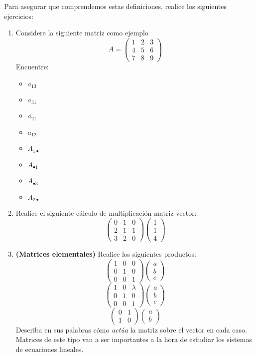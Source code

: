 Para asegurar que comprendemos estas definiciones, realice los siguientes ejercicios:

\begin{enumerate}
    \item Considere la siguiente matriz como ejemplo
    $$ A = \begin{pmatrix} 1 & 2 & 3 \\ 4 & 5 & 6 \\ 7 & 8 & 9  \end{pmatrix} $$
    Encuentre:
    \begin{itemize}
        \item $a_{13}$
        \item $a_{31}$
        \item $a_{21}$
        \item $a_{12}$
        \item $A_{1  \bullet}$
        \item $A_{\bullet  1}$
        \item $A_{\bullet  3}$
        \item $A_{2  \bullet}$
    \end{itemize}
    \item Realice el siguiente cálculo de multiplicación matriz-vector:
    $$  \begin{pmatrix} 0 & 1 & 0 \\ 2 & 1 & 1 \\ 3 & 2 & 0  \end{pmatrix} \begin{pmatrix} 1 \\ 1 \\ 4  \end{pmatrix} $$
    \item \textbf{(Matrices elementales)} Realice los siguientes productos:
$$  \begin{pmatrix} 1 & 0 & 0 \\ 0 & 1 & 0 \\ 0 & 0 & 1  \end{pmatrix} \begin{pmatrix} a \\b \\c\end{pmatrix}$$
$$  \begin{pmatrix} 1 & 0 & \lambda \\ 0 & 1 & 0 \\ 0 & 0 & 1  \end{pmatrix} \begin{pmatrix} a \\ b \\ c \end{pmatrix} $$
$$  \begin{pmatrix} 0 & 1 \\ 1 & 0  \end{pmatrix} \begin{pmatrix} a \\ b \end{pmatrix}$$
Describa en sus palabras cómo \textit{actúa} la matriz sobre el vector en cada caso. Matrices de este tipo van a ser importantes a la hora de estudiar los sistemas de ecuaciones lineales.
\end{enumerate}


